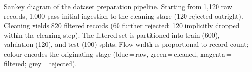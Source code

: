 \caption{Sankey diagram of the dataset preparation pipeline. Starting from 1{,}120 raw records, 1{,}000 pass initial ingestion to the cleaning stage (120 rejected outright). Cleaning yields 820 filtered records (60 further rejected; 120 implicitly dropped within the cleaning step). The filtered set is partitioned into train (600), validation (120), and test (100) splits. Flow width is proportional to record count; colour encodes the originating stage (blue\,=\,raw, green\,=\,cleaned, magenta\,=\,filtered; grey\,=\,rejected).}
